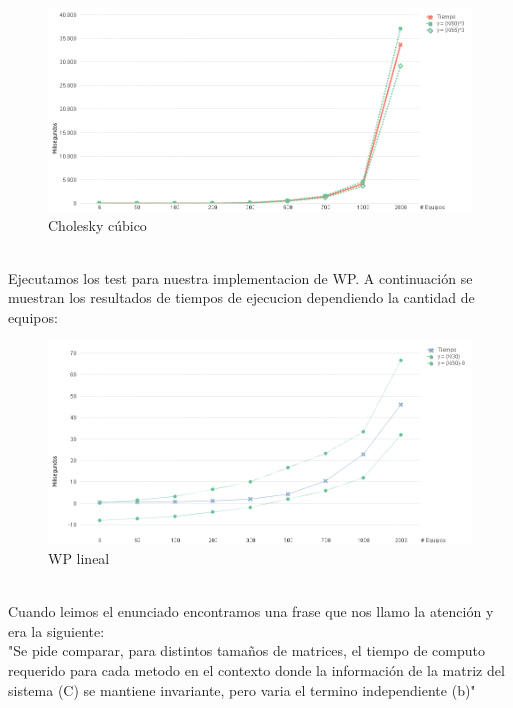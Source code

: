 \begin{figure}[H]
\centering
\includegraphics[width=1\textwidth]{IMG/cholesky cubicos.png}
\caption{Cholesky cúbico}
\label{fig:Cholesky cúbico}
\end{figure}

\\

Ejecutamos los test para nuestra implementacion de WP. A continuación se muestran los resultados de tiempos de ejecucion dependiendo la cantidad de equipos: \\


\begin{figure}[H]
\centering
\includegraphics[width=1\textwidth]{IMG/wp lineal.png}
\caption{WP lineal}
\label{fig:WP lineal}
\end{figure}

\\


Cuando leimos el enunciado encontramos una frase que nos llamo la atención y era la siguiente: \\

"Se pide comparar, para distintos tamaños de matrices, el tiempo de computo requerido para cada metodo en el contexto donde la información de la matriz del sistema (C) se mantiene invariante, pero varia el termino independiente (b)"\\

